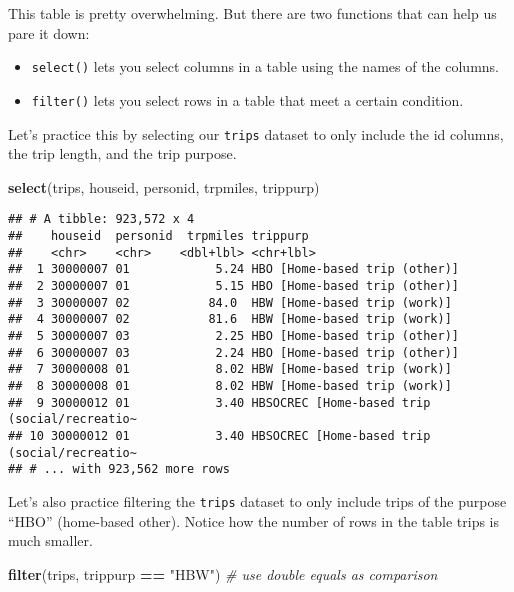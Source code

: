 \documentclass[]{book}
\newenvironment{Shaded}{\begin{snugshade}}{\end{snugshade}}
\newcommand{\CommentTok}[1]{\textcolor[rgb]{0.56,0.35,0.01}{\textit{#1}}}
\newcommand{\KeywordTok}[1]{\textcolor[rgb]{0.13,0.29,0.53}{\textbf{#1}}}
\newcommand{\NormalTok}[1]{#1}
\newcommand{\OperatorTok}[1]{\textcolor[rgb]{0.81,0.36,0.00}{\textbf{#1}}}
\newcommand{\StringTok}[1]{\textcolor[rgb]{0.31,0.60,0.02}{#1}}
\providecommand{\tightlist}{%
  \setlength{\itemsep}{0pt}\setlength{\parskip}{0pt}}
\begin{document}
This table is pretty overwhelming. But there are two functions that can help
us pare it down:

\begin{itemize}
\tightlist
\item
  \texttt{select()} lets you select columns in a table using the names of the columns.
\item
  \texttt{filter()} lets you select rows in a table that meet a certain condition.
\end{itemize}

Let's practice this by selecting our \texttt{trips} dataset to only include the id
columns, the trip length, and the trip purpose.

\begin{Shaded}
\begin{Highlighting}[]
\KeywordTok{select}\NormalTok{(trips, houseid, personid, trpmiles, trippurp)}
\end{Highlighting}
\end{Shaded}

\begin{verbatim}
## # A tibble: 923,572 x 4
##    houseid  personid  trpmiles trippurp                                    
##    <chr>    <chr>    <dbl+lbl> <chr+lbl>                                   
##  1 30000007 01            5.24 HBO [Home-based trip (other)]               
##  2 30000007 01            5.15 HBO [Home-based trip (other)]               
##  3 30000007 02           84.0  HBW [Home-based trip (work)]                
##  4 30000007 02           81.6  HBW [Home-based trip (work)]                
##  5 30000007 03            2.25 HBO [Home-based trip (other)]               
##  6 30000007 03            2.24 HBO [Home-based trip (other)]               
##  7 30000008 01            8.02 HBW [Home-based trip (work)]                
##  8 30000008 01            8.02 HBW [Home-based trip (work)]                
##  9 30000012 01            3.40 HBSOCREC [Home-based trip (social/recreatio~
## 10 30000012 01            3.40 HBSOCREC [Home-based trip (social/recreatio~
## # ... with 923,562 more rows
\end{verbatim}

Let's also practice filtering the \texttt{trips} dataset to only include trips
of the purpose ``HBO'' (home-based other). Notice how the number of rows
in the table trips is much smaller.

\begin{Shaded}
\begin{Highlighting}[]
\KeywordTok{filter}\NormalTok{(trips, trippurp }\OperatorTok{==}\StringTok{ "HBW"}\NormalTok{) }\CommentTok{# use double equals as comparison}
\end{Highlighting}
\end{Shaded}
\end{document}
